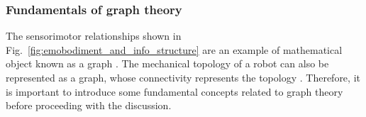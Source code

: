 

\subsubsection{Fundamentals of graph theory}
The sensorimotor relationships shown in Fig.~\ref{fig:emobodiment_and_info_structure} are an example of mathematical object known as a graph \cite{West2001Introductiongraphtheory}. The mechanical topology of a robot can also be represented as a graph, whose connectivity represents the topology \cite{Featherstone2007RigidBodyDynamics}. Therefore, it is important to introduce some fundamental concepts related to graph theory before proceeding with the discussion. 

